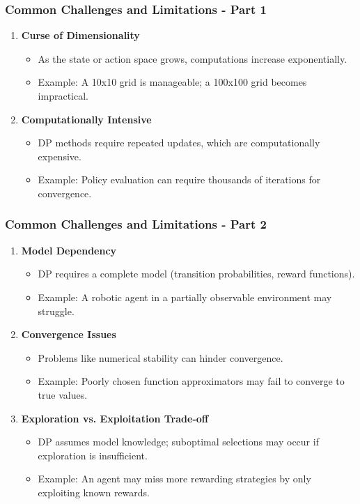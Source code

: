 \documentclass[aspectratio=169]{beamer}
\begin{document}
\begin{frame}
    \frametitle{Common Challenges and Limitations - Part 1}
    \begin{enumerate}
        \item \textbf{Curse of Dimensionality}
            \begin{itemize}
                \item As the state or action space grows, computations increase exponentially.
                \item Example: A 10x10 grid is manageable; a 100x100 grid becomes impractical.
            \end{itemize}

        \item \textbf{Computationally Intensive}
            \begin{itemize}
                \item DP methods require repeated updates, which are computationally expensive.
                \item Example: Policy evaluation can require thousands of iterations for convergence.
            \end{itemize} 
    \end{enumerate}
\end{frame}

\begin{frame}
    \frametitle{Common Challenges and Limitations - Part 2}
    \begin{enumerate}[resume]
        \item \textbf{Model Dependency}
            \begin{itemize}
                \item DP requires a complete model (transition probabilities, reward functions).
                \item Example: A robotic agent in a partially observable environment may struggle.
            \end{itemize}

        \item \textbf{Convergence Issues}
            \begin{itemize}
                \item Problems like numerical stability can hinder convergence.
                \item Example: Poorly chosen function approximators may fail to converge to true values.
            \end{itemize}

        \item \textbf{Exploration vs. Exploitation Trade-off}
            \begin{itemize}
                \item DP assumes model knowledge; suboptimal selections may occur if exploration is insufficient.
                \item Example: An agent may miss more rewarding strategies by only exploiting known rewards.
            \end{itemize}
    \end{enumerate}
\end{frame}
\end{document}
